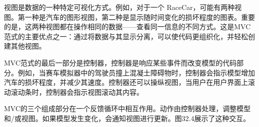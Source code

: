 视图是数据的一种特定可视化方式。例如，对于一个 RaceCar，可能有两种视图。第一种是汽车的图形视图，第二种是显示随时间变化的损坏程度的图表。重要的是，这两种视图都在操作相同的数据——查看同一信息的不同方式。这是MVC范式的主要优点之一：通过将数据与其显示分离，可以使代码更组织化，并轻松创建其他视图。

MVC范式的最后一部分是控制器，控制器是响应某些事件而改变模型的代码部分。例如，当赛车模拟器中的驾驶员撞上混凝土障碍物时，控制器会指示模型增加汽车的损坏程度，并减少其速度。控制器还可以操纵视图，当用户在用户界面上滚动滚动条时，控制器会指示视图滚动其内容。

MVC的三个组成部分在一个反馈循环中相互作用。动作由控制器处理，调整模型和/或视图。如果模型发生变化，会通知视图进行更新。图32.4展示了这种交互。












